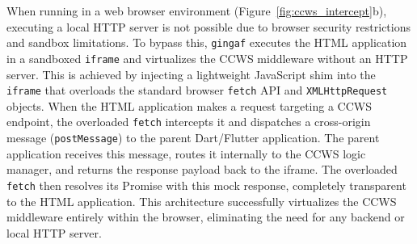 \documentclass[sigconf]{webmedia}
\newcommand{\projectname}{\texttt{gingaf}}
\begin{document}
When running in a web browser environment (Figure~\ref{fig:ccws_intercept}b), executing a local HTTP server is not possible due to browser security restrictions and sandbox limitations. To bypass this, \projectname{} executes the HTML application in a sandboxed \texttt{iframe} and virtualizes the CCWS middleware without an HTTP server. This is achieved by injecting a lightweight JavaScript shim into the \texttt{iframe} that overloads the standard browser \texttt{fetch} API and \texttt{XMLHttpRequest} objects. When the HTML application makes a request targeting a CCWS endpoint, the overloaded \texttt{fetch} intercepts it and dispatches a cross-origin message (\texttt{postMessage}) to the parent Dart/Flutter application. The parent application receives this message, routes it internally to the CCWS logic manager, and returns the response payload back to the iframe. The overloaded \texttt{fetch} then resolves its Promise with this mock response, completely transparent to the HTML application. This architecture successfully virtualizes the CCWS middleware entirely within the browser, eliminating the need for any backend or local HTTP server.
\end{document}

